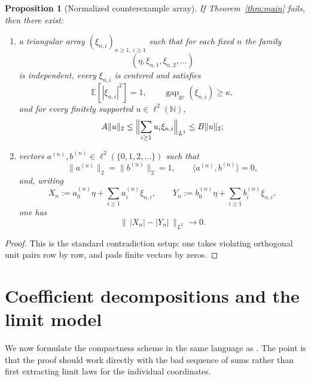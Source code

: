 \documentclass[11pt]{amsart}
\newtheorem{proposition}[theorem]{Proposition}
\newcommand{\E}{\mathbb{E}}
\newcommand{\N}{\mathbb{N}}
\newcommand{\gapgc}{\operatorname{gap}_{\mathrm{gc}}}
\begin{document}
\begin{proposition}[Normalized counterexample array]
\label{prop:counterexample}
If Theorem~\ref{thm:main} fails, then there exist:
\begin{enumerate}[label=\rm(\roman*)]
\item a triangular array $(\xi_{n,i})_{n\ge 1,\ i\ge 1}$ such that for each
  fixed $n$ the family
  \[
    (\eta,\xi_{n,1},\xi_{n,2},\dots)
  \]
  is independent, every $\xi_{n,i}$ is centered and satisfies
  \[
    \E[|\xi_{n,i}|^2]=1,
    \qquad
    \gapgc(\xi_{n,i})\ge \kappa,
  \]
  and for every finitely supported $u\in\ell^2(\N)$,
  \[
    A\|u\|_2
    \le
    \Bigl\|\sum_{i\ge 1} u_i\xi_{n,i}\Bigr\|_{L^1}
    \le
    B\|u\|_2;
  \]
\item vectors $a^{(n)},b^{(n)}\in \ell^2(\{0,1,2,\dots\})$ such that
  \[
    \|a^{(n)}\|_2=\|b^{(n)}\|_2=1,
    \qquad
    \langle a^{(n)},b^{(n)}\rangle=0,
  \]
  and, writing
  \[
    X_n:=a_0^{(n)}\eta+\sum_{i\ge 1} a_i^{(n)}\xi_{n,i},
    \qquad
    Y_n:=b_0^{(n)}\eta+\sum_{i\ge 1} b_i^{(n)}\xi_{n,i},
  \]
  one has
  \[
    \bigl\|\,|X_n|-|Y_n|\,\bigr\|_{L^2}\longrightarrow 0.
  \]
\end{enumerate}
\end{proposition}

\begin{proof}
This is the standard contradiction setup: one takes violating orthogonal unit
pairs row by row, and pads finite vectors by zeros.
\end{proof}

\section{Coefficient decompositions and the limit model}
\label{sec:compactness}

We now formulate the compactness scheme in the same language as
\cite{compactness_real}.  The point is that the proof should work directly with
the bad sequence of sums rather than first extracting limit laws for the
individual coordinates.
\end{document}
